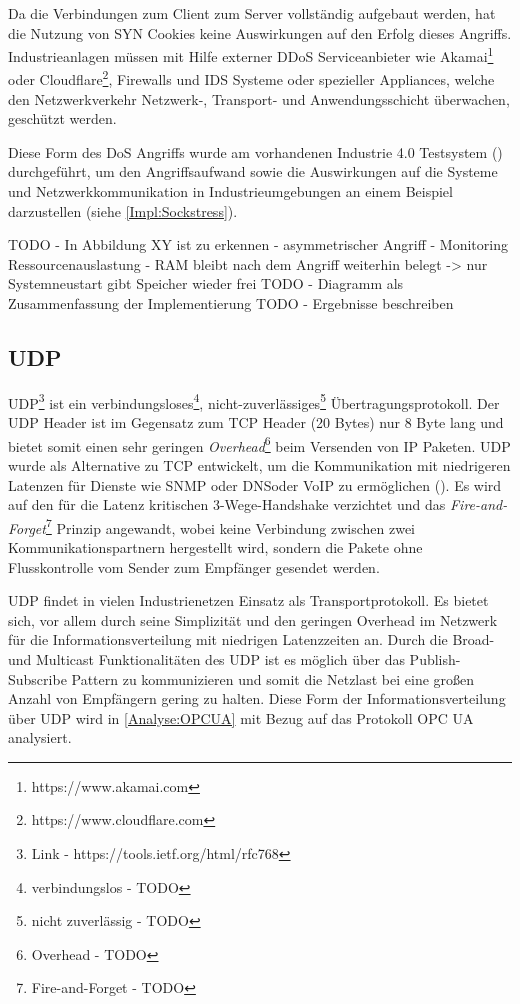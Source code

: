 Da die Verbindungen zum Client zum Server vollständig aufgebaut werden, hat die Nutzung von SYN Cookies keine Auswirkungen auf den Erfolg dieses Angriffs. Industrieanlagen müssen mit Hilfe externer \ac{DDoS} Serviceanbieter wie Akamai\footnote{https://www.akamai.com} oder Cloudflare\footnote{https://www.cloudflare.com}, Firewalls und \ac{IDS} Systeme oder spezieller Appliances, welche den Netzwerkverkehr Netzwerk-, Transport- und Anwendungsschicht überwachen, geschützt werden.

Diese Form des \ac{DoS} Angriffs wurde am vorhandenen Industrie 4.0 Testsystem (\cite{Weber2018}) durchgeführt, um den Angriffsaufwand sowie die Auswirkungen auf die Systeme und Netzwerkkommunikation in Industrieumgebungen an einem Beispiel darzustellen (siehe \autoref{Impl:Sockstress}). 

TODO - In Abbildung XY ist zu erkennen - asymmetrischer Angriff - Monitoring Ressourcenauslastung - RAM bleibt nach dem Angriff weiterhin belegt -> nur Systemneustart gibt Speicher wieder frei 
TODO - Diagramm als Zusammenfassung der Implementierung
TODO - Ergebnisse beschreiben

\subsection{\ac{UDP}}
\ac{UDP}\footnote{Link - https://tools.ietf.org/html/rfc768} ist ein verbindungsloses\footnote{verbindungslos - TODO}, nicht-zuverlässiges\footnote{nicht zuverlässig - TODO} Übertragungsprotokoll. Der \ac{UDP} Header ist im Gegensatz zum \ac{TCP} Header (20 Bytes) nur 8 Byte lang und bietet somit einen sehr geringen \textit{Overhead}\footnote{Overhead - TODO} beim Versenden von \ac{IP} Paketen. \ac{UDP} wurde als Alternative zu \ac{TCP} entwickelt, um die Kommunikation mit niedrigeren Latenzen für Dienste wie \ac{SNMP} oder \ac{DNS}oder \ac{VoIP} zu ermöglichen (\cite{UDP2003}). Es wird auf den für die Latenz kritischen 3-Wege-Handshake verzichtet und das \textit{Fire-and-Forget}\footnote{Fire-and-Forget - TODO} Prinzip angewandt, wobei keine Verbindung zwischen zwei Kommunikationspartnern hergestellt wird, sondern die Pakete ohne Flusskontrolle vom Sender zum Empfänger gesendet werden.

\ac{UDP} findet in vielen Industrienetzen Einsatz als Transportprotokoll. Es bietet sich, vor allem durch seine Simplizität und den geringen Overhead im Netzwerk für die Informationsverteilung mit niedrigen Latenzzeiten an. Durch die Broad- und Multicast Funktionalitäten des \ac{UDP} ist es möglich über das Publish-Subscribe Pattern zu kommunizieren und somit die Netzlast bei eine großen Anzahl von Empfängern gering zu halten. Diese Form der Informationsverteilung über \ac{UDP} wird in \autoref{Analyse:OPCUA} mit Bezug auf das Protokoll \ac{OPC UA} analysiert.

